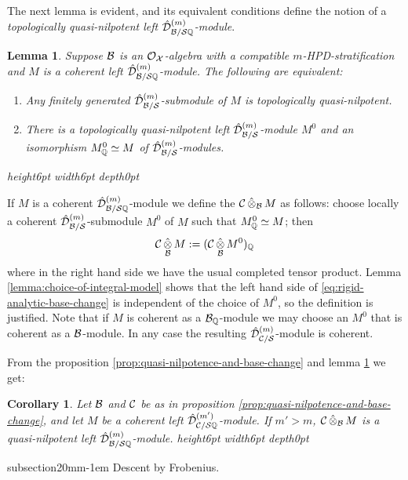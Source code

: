\documentclass{article}
\makeatletter
\theoremstyle{change}
\newtheorem{lemma}[subsubsection]{Lemma}
\newtheorem{cor}[subsubsection]{Corollary}
\renewcommand{\subsection}{\@startsection%
{subsection}{2}{0mm}{\baselineskip}{-1em}%
{\normalfont\normalsize\bfseries}}
\numberwithin{equation}{subsubsection}
\newcommand{\demobox}{\vrule height6pt width6pt depth0pt}
\newcommand{\nodemo}{\unskip\nobreak\hfil\qquad
\demobox\parfillskip=0pt\par}
\makeatother
\begin{document}
The next lemma is evident, and its equivalent conditions define the
notion of a \textit{topologically quasi-nilpotent left
  ${\hat{\cal D}}^{({m})}_{{\cal B}/{\cal S}{\mathbb Q}}$-module}. 

\begin{lemma}\label{lemma:quasi-nilpotent-Q}
  Suppose ${\cal B}$ is an ${\cal O}_{\cal X}$-algebra with a compatible
  $m$-HPD-stra\-ti\-fi\-cation and $M$ is a coherent left
  ${\hat{\cal D}}^{({m})}_{{\cal B}/{\cal S}{\mathbb Q}}$-module. The following are equivalent:
  \begin{enumerate}
  \item Any finitely generated ${\hat{\cal D}}^{({m})}_{{\cal B}/{\cal S}}$-submodule of
    $M$ is topologically quasi-nilpotent.
  \item There is a topologically quasi-nilpotent left
    ${\hat{\cal D}}^{({m})}_{{\cal B}/{\cal S}}$-module $M^0$ and an isomorphism
    $M^0_{\mathbb Q}\simeq M$ of ${\hat{\cal D}}^{({m})}_{{\cal B}/{\cal S}}$-modules.
  \end{enumerate}\nodemo
\end{lemma}

If $M$ is a coherent ${\hat{\cal D}}^{({m})}_{{\cal B}/{\cal S}{\mathbb Q}}$-module we define the
${\cal C}\mathop{\hat\otimes}_{\cal B} M$ as follows: choose locally a coherent
${\hat{\cal D}}^{({m})}_{{\cal B}/{\cal S}}$-submodule $M^0$ of $M$ such that
$M^0_{\mathbb Q}\simeq M$; then
\begin{equation}
  \label{eq:rigid-analytic-base-change}
  {\cal C}\mathop{\hat\otimes}_{\cal B} M:=({\cal C}\mathop{\hat\otimes}_{\cal B} M^0)_{\mathbb Q}
\end{equation}
where in the right hand side we have the usual completed tensor
product. Lemma \ref{lemma:choice-of-integral-model} shows that the
left hand side of \ref{eq:rigid-analytic-base-change} is independent
of the choice of $M^0$, so the definition is justified. Note that if
$M$ is coherent as a ${\cal B}_{\mathbb Q}$-module we may choose an $M^0$ that is
coherent as a ${\cal B}$-module. In any case the resulting
${\hat{\cal D}}^{({m})}_{{\cal C}/{\cal S}}$-module is coherent.

From the proposition \ref{prop:quasi-nilpotence-and-base-change} and
lemma \ref{lemma:quasi-nilpotent-Q} we get:

\begin{cor}\label{cor:quasi-nilpotence-and-base-change}
  Let ${\cal B}$ and ${\cal C}$ be as in proposition
  \ref{prop:quasi-nilpotence-and-base-change}, and let $M$ be a
  coherent left ${\hat{\cal D}}^{({m'})}_{{\cal C}/{\cal S}{\mathbb Q}}$-module. If $m'>m$,
  ${\cal C}\mathop{\hat\otimes}_{\cal B} M$ is a quasi-nilpotent left
  ${\hat{\cal D}}^{({m})}_{{\cal B}/{\cal S}{\mathbb Q}}$-module.\nodemo
\end{cor}

\subsection{Descent by Frobenius.}
\label{sec:Frobenius-descent}
\end{document}

